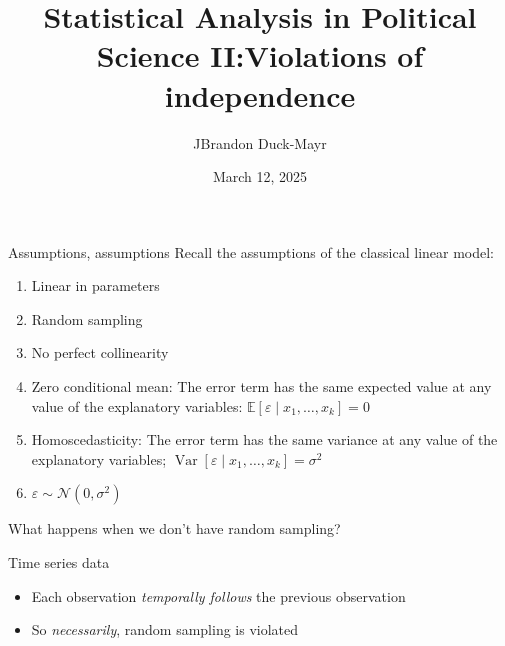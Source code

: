 \documentclass[
  ignorenonframetext,
]{beamer}
\title{Statistical Analysis in Political Science II:\newline Violations of independence}
\author{JBrandon Duck-Mayr}
\date{March 12, 2025}
\providecommand{\tightlist}{%
  \setlength{\itemsep}{0pt}\setlength{\parskip}{0pt}}
\newcommand{\setsep}{\setlength{\itemsep}{3pt}}
\newcommand{\setskip}{\setlength{\parskip}{3pt}}
\renewcommand{\tightlist}{\setsep\setskip}
\begin{document}
\frame{\titlepage}

\begin{frame}{Assumptions, assumptions}
\label{assumptions-assumptions}
Recall the assumptions of the classical linear model:

\pause

\begin{enumerate}
\tightlist
\item
  Linear in parameters
\item
  Random sampling
\item
  No perfect collinearity
\item
  Zero conditional mean: The error term has the same expected value at any value of the explanatory variables: \(\ensuremath{\mathbb{E}\left[\varepsilon \mid x_1, \dots, x_k\right]} = 0\)
\item
  Homoscedasticity: The error term has the same variance at any value of the explanatory variables; \(\ensuremath{\mathop{\mathrm{Var}}\left[\varepsilon \mid x_1, \dots, x_k\right]} = \sigma^2\)
\item
  \(\varepsilon \sim \mathcal{N}\left( 0, \sigma^2 \right)\)
\end{enumerate}

\pause

What happens when we don't have random sampling?
\end{frame}

\begin{frame}{Time series data}
\label{time-series-data}
\pause

\begin{itemize}[<+->]
\tightlist
\item
  Each observation \emph{temporally follows} the previous observation
\item
  So \emph{necessarily}, random sampling is violated
\end{itemize}
\end{frame}
\end{document}
